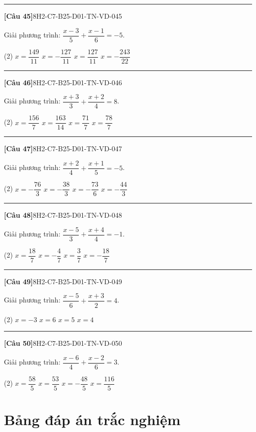 \documentclass[12pt,a4paper]{article}
\newif\ifloigiai
\newenvironment{cauhoi}[2]{%
  \par\medskip\noindent\rule{\textwidth}{0.4pt}\par\nopagebreak
  \noindent\textbf{[#1]}\hfill{\scriptsize\ttfamily #2}\par\nopagebreak\smallskip}{\par}
\newcommand{\dapan}[1]{\ifloigiai\par\smallskip\noindent\textit{Đáp án:} \textbf{#1}\par\fi}
\begin{document}
\begin{cauhoi}{Câu 45}{8H2-C7-B25-D01-TN-VD-045}
Giải phương trình: $\dfrac{x - 3}{5}+\dfrac{x - 1}{6}=-5$.
\begin{tasks}(2)
\task $x=\dfrac{149}{11}$
\task $x=-\dfrac{127}{11}$
\task $x=\dfrac{127}{11}$
\task $x=-\dfrac{243}{22}$
\end{tasks}
\dapan{B}
\end{cauhoi}
\begin{cauhoi}{Câu 46}{8H2-C7-B25-D01-TN-VD-046}
Giải phương trình: $\dfrac{x + 3}{3}+\dfrac{x + 2}{4}=8$.
\begin{tasks}(2)
\task $x=\dfrac{156}{7}$
\task $x=\dfrac{163}{14}$
\task $x=\dfrac{71}{7}$
\task $x=\dfrac{78}{7}$
\end{tasks}
\dapan{D}
\end{cauhoi}
\begin{cauhoi}{Câu 47}{8H2-C7-B25-D01-TN-VD-047}
Giải phương trình: $\dfrac{x + 2}{4}+\dfrac{x + 1}{5}=-5$.
\begin{tasks}(2)
\task $x=-\dfrac{76}{3}$
\task $x=-\dfrac{38}{3}$
\task $x=-\dfrac{73}{6}$
\task $x=-\dfrac{44}{3}$
\end{tasks}
\dapan{B}
\end{cauhoi}
\begin{cauhoi}{Câu 48}{8H2-C7-B25-D01-TN-VD-048}
Giải phương trình: $\dfrac{x - 5}{3}+\dfrac{x + 4}{4}=-1$.
\begin{tasks}(2)
\task $x=\dfrac{18}{7}$
\task $x=-\dfrac{4}{7}$
\task $x=\dfrac{3}{7}$
\task $x=-\dfrac{18}{7}$
\end{tasks}
\dapan{B}
\end{cauhoi}
\begin{cauhoi}{Câu 49}{8H2-C7-B25-D01-TN-VD-049}
Giải phương trình: $\dfrac{x - 5}{6}+\dfrac{x + 3}{2}=4$.
\begin{tasks}(2)
\task $x=-3$
\task $x=6$
\task $x=5$
\task $x=4$
\end{tasks}
\dapan{C}
\end{cauhoi}
\begin{cauhoi}{Câu 50}{8H2-C7-B25-D01-TN-VD-050}
Giải phương trình: $\dfrac{x - 6}{4}+\dfrac{x - 2}{6}=3$.
\begin{tasks}(2)
\task $x=\dfrac{58}{5}$
\task $x=\dfrac{53}{5}$
\task $x=-\dfrac{48}{5}$
\task $x=\dfrac{116}{5}$
\end{tasks}
\dapan{A}
\end{cauhoi}
\clearpage\section*{Bảng đáp án trắc nghiệm}
\end{document}
